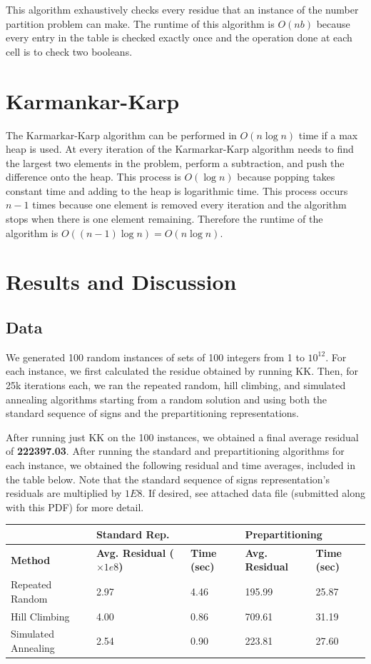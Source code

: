 \documentclass[a4paper]{article}
\begin{document}
	This algorithm exhaustively checks every residue that an instance of the number partition problem can make. The runtime of this algorithm is $O(nb)$ because every entry in the table is checked exactly once and the operation done at each cell is to check two booleans.
	
	\section{Karmankar-Karp}
	The Karmarkar-Karp algorithm can be performed in $O(n\log n)$ time if a max heap is used. At every iteration of the Karmarkar-Karp algorithm needs to find the largest two elements in the problem, perform a subtraction, and push the difference onto the heap. This process is $O(\log n)$ because popping takes constant time and adding to the heap is logarithmic time. This process occurs $n-1$ times because one element is removed every iteration and the algorithm stops when there is one element remaining. Therefore the runtime of the algorithm is $O((n-1) \log n) = O(n\log n)$.
	
	\section{Results and Discussion}
	\subsection{Data}
	We generated 100 random instances of sets of 100 integers from 1 to $10^{12}$. For each instance, we first calculated the residue obtained by running KK. Then, for 25k iterations each, we ran the repeated random, hill climbing, and simulated annealing algorithms starting from a random solution and using both the standard sequence of signs and the prepartitioning representations. 
	
	After running just KK on the 100 instances, we obtained a final average residual of \textbf{222397.03}. After running the standard and prepartitioning algorithms for each instance, we obtained the following residual and time averages, included in the table below. Note that the standard sequence of signs representation's residuals are multiplied by $1E8$. If desired, see attached data file (submitted along with this PDF) for more detail. 
	
\begin{tabular}{l|ll|ll}
\textbf{}           & \multicolumn{2}{l|}{\textbf{Standard Rep.}}               & \multicolumn{2}{l|}{\textbf{Prepartitioning}} \\ \hline
\textbf{Method}     & \textbf{Avg. Residual ($\times 1e8$)} & \textbf{Time (sec)} & \textbf{Avg. Residual}  & \textbf{Time (sec)} \\ \hline
Repeated Random     & 2.97                                & 4.46                & 195.99                  & 25.87               \\
Hill Climbing       & 4.00                                & 0.86                & 709.61                  & 31.19               \\
Simulated Annealing & 2.54                                & 0.90                & 223.81                  & 27.60              
\end{tabular}
	
\end{document}
